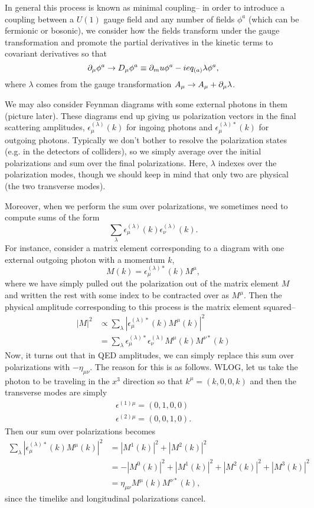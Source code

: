 In general this process is known as minimal coupling-- in order to introduce a coupling between a $U(1)$ gauge field and any number of fields $\phi^a$ (which can be fermionic or bosonic), we consider how the fields transform under the gauge transformation and promote the partial derivatives in the kinetic terms to covariant derivatives so that
$$\partial_\mu \phi^a \to D_\mu \phi^a \equiv \partial_mu \phi^a -ie q_{(a)} \lambda \phi^a,$$
where $\lambda$ comes from the gauge transformation $A_\mu \to A_\mu + \partial_\mu \lambda$.

We may also consider Feynman diagrams with some external photons in them (picture later).%
These diagrams end up giving us polarization vectors in the final scattering amplitudes, $\epsilon_\mu^{(\lambda)}(k)$ for ingoing photons and $\epsilon_{\mu}^{(\lambda)*}(k)$ for outgoing photons. Typically we don't bother to resolve the polarization states (e.g. in the detectors of colliders), so we simply average over the initial polarizations and sum over the final polarizations. Here, $\lambda$ indexes over the polarization modes, though we should keep in mind that only two are physical (the two transverse modes).

Moreover, when we perform the sum over polarizations, we sometimes need to compute sums of the form 
$$\sum_\lambda \epsilon_{\mu}^{(\lambda)}(k) \epsilon_{\nu}^{(\lambda)}(k).$$ For instance, consider a matrix element corresponding to a diagram with one external outgoing photon with a momentum $k$,
\begin{equation}
    M(k)=\epsilon_\mu^{(\lambda)*} (k) M^\mu,
\end{equation}
where we have simply pulled out the polarization out of the matrix element $M$ and written the rest with some index to be contracted over as $M^\mu$. Then the physical amplitude corresponding to this process is the matrix element squared--
\begin{align*}
    |M|^2 &\propto \sum_\lambda |\epsilon_\mu^{(\lambda)*} (k)M^\mu (k)|^2\\
    &= \sum_\lambda \epsilon_\mu^{(\lambda)*} \epsilon_\nu^{(\lambda)} M^\mu(k) M^{\nu *}(k)
\end{align*}
Now, it turns out that in QED amplitudes, we can simply replace this sum over polarizations with $-\eta_{\mu\nu}$. The reason for this is as follows. WLOG, let us take the photon to be traveling in the $x^3$ direction so that $k^\mu=(k,0,0,k)$ and then the transverse modes are simply
\begin{align*}
    \epsilon^{(1)\mu}=(0,1,0,0)\\
    \epsilon^{(2)\mu}=(0,0,1,0).
\end{align*}
Then our sum over polarizations becomes
\begin{align*}
    \sum_\lambda |\epsilon_\mu^{(\lambda)*} (k)M^\mu (k)|^2 &= |M^1(k)|^2 + |M^2(k)|^2\\
    &=-|M^0(k)|^2 + |M^1(k)|^2 + |M^2(k)|^2 + |M^3(k)|^2\\
    &= \eta_{\mu\nu} M^\mu(k) M^{\nu*}(k),
\end{align*}
since the timelike and longitudinal polarizations cancel.%

